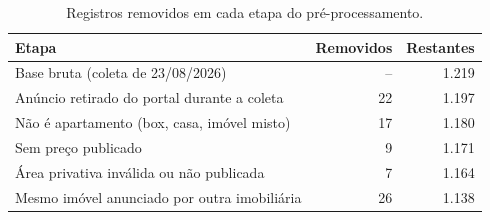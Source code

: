 \begin{table}[ht]
\centering
\caption{Registros removidos em cada etapa do pré-processamento.}
\label{tab:funil}
\begin{tabularx}{\columnwidth}{Xrr}
\toprule
\textbf{Etapa} & \textbf{Removidos} & \textbf{Restantes} \\
\midrule
Base bruta (coleta de 23/08/2026) & -- & 1.219 \\
Anúncio retirado do portal durante a coleta & 22 & 1.197 \\
Não é apartamento (box, casa, imóvel misto) & 17 & 1.180 \\
Sem preço publicado & 9 & 1.171 \\
Área privativa inválida ou não publicada & 7 & 1.164 \\
Mesmo imóvel anunciado por outra imobiliária & 26 & 1.138 \\
\bottomrule
\end{tabularx}
\end{table}

